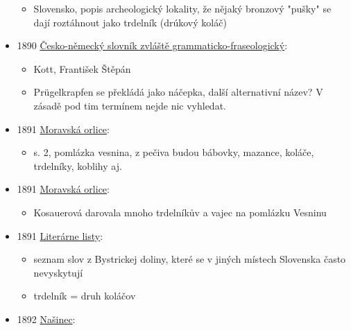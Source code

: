\begin{itemize}
  \begin{itemize}
  \tightlist
  \item
    Slovensko, popis archeologický lokality, že nějaký bronzový "pušky"
    se dají roztáhnout jako trdelník (drúkový koláč)
  \end{itemize}
\item
  1890
  \href{https://ndk.cz/view/uuid:18b40310-07ad-11dd-8ccf-000d606f5dc6?page=uuid\%3Aae6c9544-ef09-495a-bf20-9e525fdb15b2&fulltext=Pr\%C3\%BCgelkrapfen}{Česko-německý
  slovník zvláště grammaticko-fraseologický}:

  \begin{itemize}
  \tightlist
  \item
    Kott, František Štěpán
  \item
    Prügelkrapfen se překládá jako náčepka, další alternativní název? V
    zásadě pod tim termínem nejde nic vyhledat.
  \end{itemize}
\item
  1891
  \href{https://ceskadigitalniknihovna.cz/uuid/uuid:04e43cad-32f0-11de-992b-00145e5790ea}{Moravská
  orlice}:

  \begin{itemize}
  \tightlist
  \item
    s. 2, pomlázka vesnina, z pečiva budou bábovky, mazance, koláče,
    trdelníky, koblihy aj.
  \end{itemize}
\item
  1891
  \href{https://ceskadigitalniknihovna.cz/view/uuid:04e48ad6-32f0-11de-992b-00145e5790ea?page=uuid:27df031c-32f0-11de-992b-00145e5790ea&fulltext=vaje\%C4\%8D*\%20trdel*&source=mzk}{Moravská
  orlice}:

  \begin{itemize}
  \tightlist
  \item
    Kosauerová darovala mnoho trdelníkův a vajec na pomlázku Vesninu
  \end{itemize}
\item
  1891
  \href{https://www.google.cz/books/edition/Liter\%C3\%A1rne_listy/iTmko65VuoQC?hl=cs&gbpv=1&dq=trdeln\%C3\%ADk&pg=RA5-PA64&printsec=frontcover}{Literárne
  listy}:

  \begin{itemize}
  \tightlist
  \item
    seznam slov z Bystrickej doliny, které se v jiných místech Slovenska
    často nevyskytují
  \item
    trdelník = druh koláčov
  \end{itemize}
\item
  1892
  \href{https://ceskadigitalniknihovna.cz/uuid/uuid:852faf14-821a-11e0-b92b-0050569d679d}{Našinec}:


\end{itemize}
